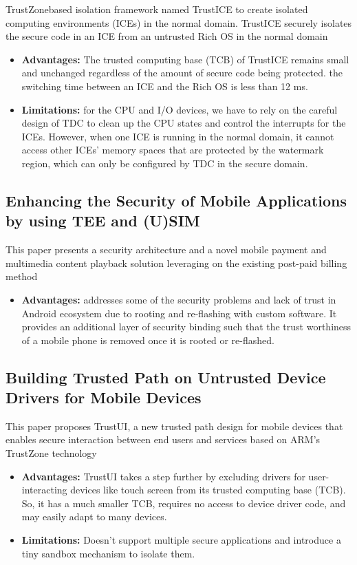 \documentclass[conference]{IEEEtran}
\begin{document}
TrustZonebased isolation framework named TrustICE to create isolated computing environments (ICEs) in the normal domain. TrustICE securely isolates the secure code in an ICE from an untrusted Rich OS in the normal domain
\begin{itemize}
    \item \textbf{Advantages:} The trusted computing base (TCB) of TrustICE remains small and unchanged regardless of the amount of secure code being protected. the switching time between an ICE and the Rich OS is less than 12 ms.
    \item \textbf{Limitations:} for the CPU and I/O devices, we have to rely on the careful design of TDC to clean up the CPU states and control the interrupts for the ICEs. However, when one ICE is running in the normal domain, it cannot access other ICEs’ memory spaces that are protected by the watermark region, which can only be configured by TDC in the secure domain.
\end{itemize}


\subsection{Enhancing the Security of Mobile Applications by using TEE and (U)SIM}
This paper presents a security architecture and a novel mobile payment and multimedia content playback solution leveraging on the existing post-paid billing method
\begin{itemize}
    \item \textbf{Advantages:} addresses some of the security problems and lack of trust in Android ecosystem due to rooting and re-flashing with custom software. It provides an additional layer of security binding such that the trust worthiness of a mobile phone is removed once it is rooted or re-flashed.
\end{itemize}


\subsection{Building Trusted Path on Untrusted Device Drivers for Mobile Devices}
This paper proposes TrustUI, a new trusted path design for mobile devices that enables secure interaction between end users and services based on ARM’s TrustZone technology
\begin{itemize}
    \item \textbf{Advantages:} TrustUI takes a step further by excluding drivers for user-interacting devices like touch screen from its trusted computing base (TCB). So, it has a much smaller TCB, requires no access to device driver code, and may easily adapt to many devices.
    \item \textbf{Limitations:} Doesn't support multiple secure applications and introduce a tiny sandbox mechanism to isolate them.
\end{itemize}
\end{document}
